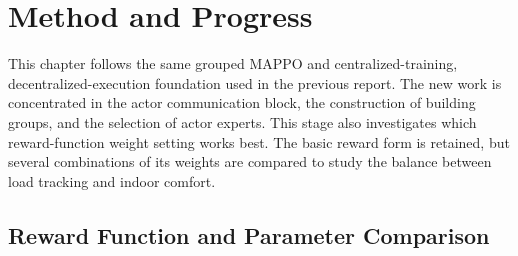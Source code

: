 \chapter{Method and Progress}\label{ch:method}

This chapter follows the same grouped MAPPO and centralized-training,
decentralized-execution foundation used in the previous report. The new work is
concentrated in the actor communication block, the construction of building
groups, and the selection of actor experts. This stage also investigates which
reward-function weight setting works best. The basic reward form is retained,
but several combinations of its weights are compared to study the balance
between load tracking and indoor comfort.


\section{Reward Function and Parameter Comparison}

